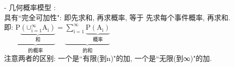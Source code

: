 \documentclass[UTF8]{ctexart}
\begin{document}
	- 几何概率模型 : \\
	具有``完全可加性":  即先求和, 再求概率, 等于 先求每个事件概率, 再求和. \\
	即: $
	\underset{\text{的概率}}{\underbrace{\text{P}\underset{\text{和}}{\underbrace{\left( \text{∪}_{\text{i}=1}^{\infty}\text{A}_{\text{i}} \right) }}}}=\underset{\text{的和}}{\underbrace{\sum_{\text{i}=1}^{\infty}{\underset{\text{概率}}{\underbrace{\text{P}\left( \text{A}_{\text{i}} \right) }}}}}
	$ \\
	
	注意两者的区别: 一个是``有限(到n)"的加,  一个是``无限(到∞)"的加.
	
	
	
	
	
	
\end{document}
